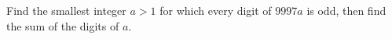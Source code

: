 Find the smallest integer $a>1$ for which every digit of $9997a$ is odd, then find the sum of the digits of $a$.
